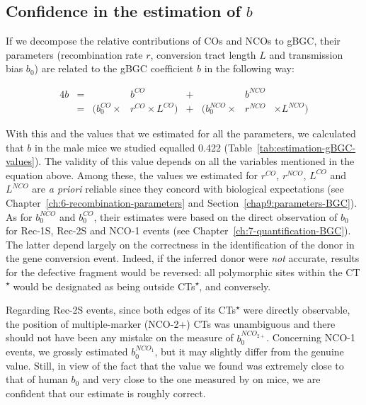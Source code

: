 \subsection{Confidence in the estimation of $b$}

If we decompose the relative contributions of COs and NCOs to gBGC, their parameters (recombination rate $r$, conversion tract length $L$ and transmission bias $b_0$) are related to the gBGC coefficient $b$ in the following way:

\begin{alignat*}{4}
	b&={}& 					   &b^{CO} 					&{}+{}& 					 &b^{NCO}& \\
	 &={}& ( b_{0}^{CO} \times &r^{CO} \times L^{CO} ) 	&{}+{}& ( b_{0}^{NCO} \times &r^{NCO}& \times L^{NCO} )
\end{alignat*}


With this and the values that we estimated for all the parameters, we calculated that $b$ in the male mice we studied equalled 0.422 (Table~\ref{tab:estimation-gBGC-values}).
The validity of this value depends on all the variables mentioned in the equation above.
Among these, the values we estimated for $r^{CO}$, $r^{NCO}$, $L^{CO}$ and $L^{NCO}$ are \textit{a priori} reliable since they concord with biological expectations (see Chapter~\ref{ch:6-recombination-parameters} and Section~\ref{chap9:parameters-BGC}).\\

As for $b_{0}^{NCO}$ and $b_{0}^{CO}$, their estimates were based on the direct observation of $b_0$ for Rec-1S, Rec-2S and NCO-1 events (see Chapter~\ref{ch:7-quantification-BGC}).
The latter depend largely on the correctness in the identification of the donor in the gene conversion event. 
Indeed, if the inferred donor were \textit{not} accurate, results for the defective fragment would be reversed: all polymorphic sites within the CT\textsuperscript{$\star$} would be designated as being outside CTs\textsuperscript{$\star$}, and conversely.

Regarding Rec-2S events, since both edges of its CTs\textsuperscript{$\star$} were directly observable, the position of multiple-marker (NCO-2+) CTs was unambiguous and there should not have been any mistake on the measure of $b_0^{NCO_{2+}}$.
Concerning NCO-1 events, we grossly estimated $b_0^{NCO_1}$, but it may slightly differ from the genuine value. 
Still, in view of the fact that the value we found was extremely close to that of human $b_0$ \citep{williams2015noncrossover,halldorsson2016rate} and very close to the one measured by \citet{li2018highresolution} on mice, we are confident that our estimate is roughly correct.

